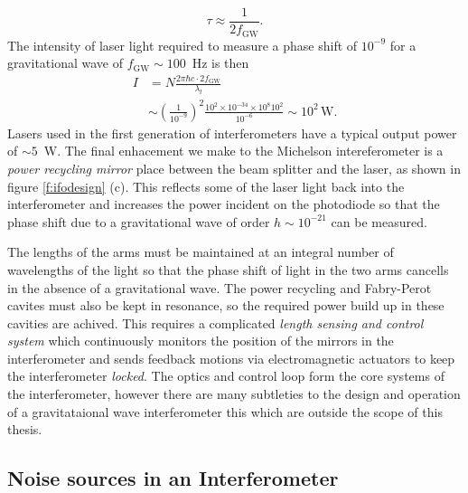 \begin{equation}
\tau \approx \frac{1}{2 f_\mathrm{GW}}.
\end{equation}
The intensity of laser light required to measure a phase shift of $10^{-9}$
for a gravitational wave of $f_\mathrm{GW} \sim 100$~Hz is then
\begin{equation}
\begin{split}
I &= N \frac{2 \pi \hbar c \cdot 2f_\mathrm{GW}}{\lambda_l} \\
&\sim \left(\frac{1}{10^{-9}}\right)^2 
\frac{10^2 \times 10^{-34} \times 10^{8} 10^2 } { 10^{-6} } \sim 10^2\,
\mathrm{W}.
\end{split}
\end{equation}
Lasers used in the first generation of interferometers have a typical output
power of $\sim 5$~W. The final enhacement we make to the Michelson
intereferometer is a \emph{power recycling mirror} place between the beam
splitter and the laser, as shown in figure \ref{f:ifodesign} (c). This reflects
some of the laser light back into the interferometer and increases the power
incident on the photodiode so that the phase shift due to a gravitational wave
of order $h \sim 10^{-21}$ can be measured.

The lengths of the arms must be maintained at an integral number of
wavelengths of the light so that the phase shift of light in the two arms
cancells in the absence of a gravitational wave. The power recycling and
Fabry-Perot cavites must also be kept in resonance, so the required power
build up in these cavities are achived. This requires a complicated
\emph{length sensing and control system}\cite{sigg} which continuously
monitors the position of the mirrors in the interferometer and sends feedback
motions via electromagnetic actuators to keep the interferometer
\emph{locked}. The optics and control loop form the core systems of the
interferometer, however there are many subtleties to the design and operation
of a gravitataional wave interferometer this which are outside the scope of
this thesis.

\subsection{Noise sources in an Interferometer}
\label{ss:noise}

